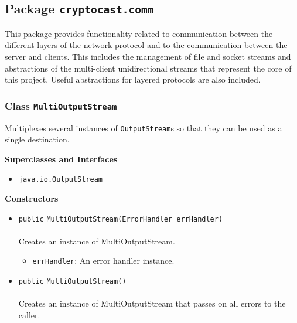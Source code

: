 \subsection{Package \lstinline!cryptocast.comm!}
This package provides functionality related to communication between the different layers
 of the network protocol and to the communication between the server and clients. This includes
 the management of file and socket streams and abstractions of the multi-client unidirectional
 streams that represent the core of this project.
 Useful abstractions for layered protocols are also included.

\subsubsection{Class \lstinline|MultiOutputStream|}
Multiplexes several instances of \lstinline|OutputStream|s so that they can be used as a single
 destination. \\
\noindent\begin{minipage}[t]{5cm}
\vspace{0.3em}
\hspace*{2em}
\vspace{0.3em}
\end{minipage}



\textbf{\sffamily Superclasses and Interfaces}
\begin{itemize}
\item \lstinline|java.io.OutputStream|
\end{itemize}


\textbf{\sffamily Constructors}
\begin{itemize}
\item \lstinline|public| \lstinline|MultiOutputStream|\lstinline|(ErrorHandler errHandler)|\\ \\[-0.6em]
Creates an instance of MultiOutputStream.
\begin{itemize}
\item \lstinline|errHandler|: An error handler instance.
\end{itemize}



\item \lstinline|public| \lstinline|MultiOutputStream|\lstinline|()|\\ \\[-0.6em]
Creates an instance of MultiOutputStream that passes on all errors to
 the caller.



\end{itemize}



